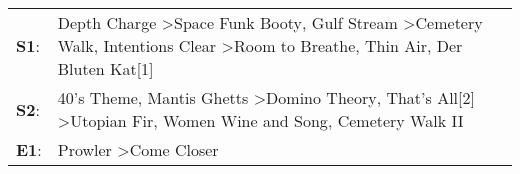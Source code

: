 \begin{supertabular}{p{0.03\textwidth}p{0.92\textwidth}}
 \textbf{S1}:  &  Depth Charge\textsuperscript{} \textgreater \enspace Space Funk Booty\textsuperscript{}, \enspace Gulf Stream\textsuperscript{} \textgreater \enspace Cemetery Walk\textsuperscript{}, \enspace Intentions Clear\textsuperscript{} \textgreater \enspace Room to Breathe\textsuperscript{}, \enspace Thin Air\textsuperscript{}, \enspace Der Bluten Kat[1]\textsuperscript{}  \enspace  \\
 \textbf{S2}:  &                                                        40's Theme\textsuperscript{}, \enspace Mantis Ghetts\textsuperscript{} \textgreater \enspace Domino Theory\textsuperscript{}, \enspace That's All[2]\textsuperscript{} \textgreater \enspace Utopian Fir\textsuperscript{}, \enspace Women Wine and Song\textsuperscript{}, \enspace Cemetery Walk II\textsuperscript{}  \enspace  \\
 \textbf{E1}:  &                                                                                                                                                                                                                                                                                                  Prowler\textsuperscript{} \textgreater \enspace Come Closer\textsuperscript{}  \enspace  \\
\end{supertabular}
